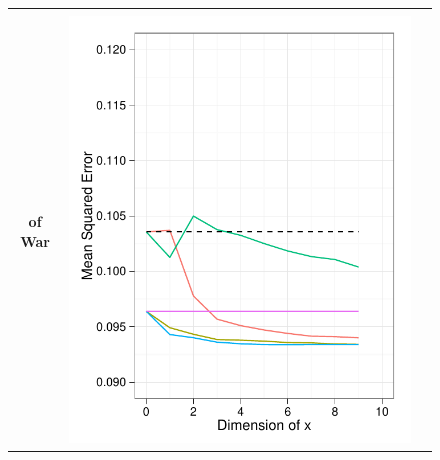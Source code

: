 \begin{figure}
\begin{tabular}{|c|c|c|}
\hline
  \begin{minipage}{2cm}  \vspace{-3cm} \textbf{Correlates} \\ \textbf{of War}
    \vspace{4cm} \end{minipage}
  & \includegraphics[height=0.27\textheight]{chapter_foreign_relations/figures/008_static_model_results.pdf}

\end{tabular}
\end{figure}
